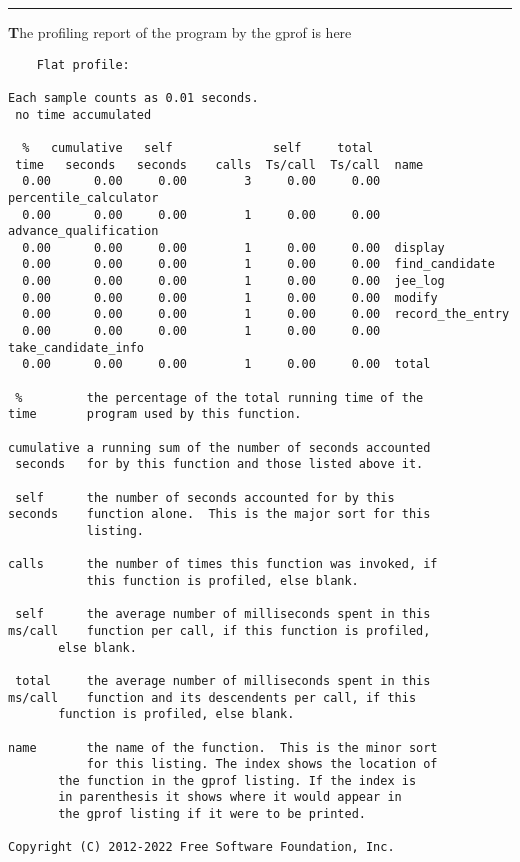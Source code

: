 \documentclass{article}
\begin{document}
\vspace{5mm}
\par\noindent\rule{\textwidth}{0.4pt}


{\textbf The profiling report of the program by the gprof is here }
\begin{verbatim}
    Flat profile:

Each sample counts as 0.01 seconds.
 no time accumulated

  %   cumulative   self              self     total           
 time   seconds   seconds    calls  Ts/call  Ts/call  name    
  0.00      0.00     0.00        3     0.00     0.00  percentile_calculator
  0.00      0.00     0.00        1     0.00     0.00  advance_qualification
  0.00      0.00     0.00        1     0.00     0.00  display
  0.00      0.00     0.00        1     0.00     0.00  find_candidate
  0.00      0.00     0.00        1     0.00     0.00  jee_log
  0.00      0.00     0.00        1     0.00     0.00  modify
  0.00      0.00     0.00        1     0.00     0.00  record_the_entry
  0.00      0.00     0.00        1     0.00     0.00  take_candidate_info
  0.00      0.00     0.00        1     0.00     0.00  total

 %         the percentage of the total running time of the
time       program used by this function.

cumulative a running sum of the number of seconds accounted
 seconds   for by this function and those listed above it.

 self      the number of seconds accounted for by this
seconds    function alone.  This is the major sort for this
           listing.

calls      the number of times this function was invoked, if
           this function is profiled, else blank.

 self      the average number of milliseconds spent in this
ms/call    function per call, if this function is profiled,
	   else blank.

 total     the average number of milliseconds spent in this
ms/call    function and its descendents per call, if this
	   function is profiled, else blank.

name       the name of the function.  This is the minor sort
           for this listing. The index shows the location of
	   the function in the gprof listing. If the index is
	   in parenthesis it shows where it would appear in
	   the gprof listing if it were to be printed.

Copyright (C) 2012-2022 Free Software Foundation, Inc.


\end{verbatim}
\end{document}
